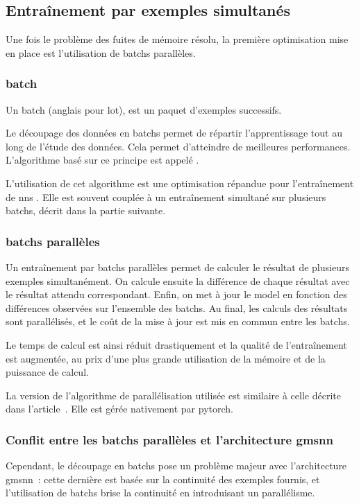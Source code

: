 
\newpage
\subsection{Entraînement par exemples simultanés} \label{subsec:optibatch}
Une fois le problème des fuites de mémoire résolu, la première optimisation mise en place est l'utilisation de \glspl{batch} parallèles.

\subsubsection{\Gls{batch}}
Un \gls{batch} (anglais pour lot), est un paquet d'exemples successifs.

Le découpage des données en \glspl{batch} permet de répartir l'apprentissage tout au long de l'étude des données.
Cela permet d'atteindre de meilleures performances.
L'algorithme basé sur ce principe est appelé  \autocite{batch}.

L'utilisation de cet algorithme est une optimisation répandue pour l'entraînement de \glspl{nn} \autocite{batch}.
Elle est souvent couplée à un entraînement simultané sur plusieurs \glspl{batch}, décrit dans la partie suivante.

\subsubsection{\Glspl{batch} parallèles}
Un entraînement par \glspl{batch} parallèles permet de calculer le résultat de plusieurs exemples simultanément.
On calcule ensuite la différence de chaque résultat avec le résultat attendu correspondant.
Enfin, on met à jour le \gls{model} en fonction des différences observées sur l'ensemble des \glspl{batch}.
Au final, les calculs des résultats sont parallélisés, et le coût de la mise à jour est mis en commun entre les \glspl{batch}.

Le temps de calcul est ainsi réduit drastiquement et la qualité de l'entraînement est augmentée, au prix d'une plus grande utilisation de la mémoire et de la puissance de calcul.

La version de l'algorithme de parallélisation utilisée est similaire à celle décrite dans l'article~\autocite{batch_parallel}. Elle est gérée nativement par \gls{pytorch}.

\subsubsection{Conflit entre les \glspl{batch} parallèles et l'architecture \gls{gmsnn}}
Cependant, le découpage en \glspl{batch} pose un problème majeur avec l'architecture \gls{gmsnn}~: cette dernière est basée sur la continuité des exemples fournis, et l'utilisation de \glspl{batch} brise la continuité en introduisant un parallélisme.

